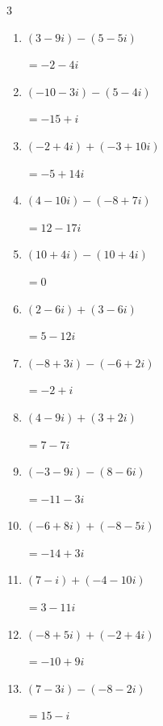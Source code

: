 \begin{multicols}{3}
\begin{enumerate}
        $\displaystyle =-13-15i$

\columnbreak %

  \item $\displaystyle (3-9i) - (5-5i)$

        $\displaystyle =-2-4i$

  \item $\displaystyle (-10-3i) - (5-4i)$

        $\displaystyle =-15+i$

  \item $\displaystyle (-2+4i) + (-3+10i)$

        $\displaystyle =-5+14i$

  \item $\displaystyle (4-10i) - (-8+7i)$

        $\displaystyle =12-17i$

  \item $\displaystyle (10+4i) - (10+4i)$

        $\displaystyle =0$

  \item $\displaystyle (2-6i) + (3-6i)$

        $\displaystyle =5-12i$

  \item $\displaystyle (-8+3i) - (-6+2i)$

        $\displaystyle =-2+i$

  \item $\displaystyle (4-9i) + (3+2i)$

        $\displaystyle =7-7i$

  \item $\displaystyle (-3-9i) - (8-6i)$

        $\displaystyle =-11-3i$

  \item $\displaystyle (-6+8i) + (-8-5i)$

        $\displaystyle =-14+3i$

  \item $\displaystyle (7-i) + (-4-10i)$

        $\displaystyle =3-11i$

  \item $\displaystyle (-8+5i) + (-2+4i)$

        $\displaystyle =-10+9i$

  \item $\displaystyle (7-3i) - (-8-2i)$

        $\displaystyle =15-i$


\end{enumerate}
\end{multicols}
